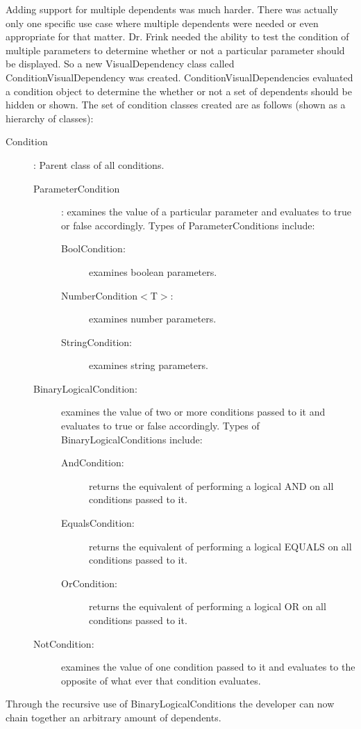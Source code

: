 Adding support for multiple dependents was much harder. There was actually only one specific use case where multiple dependents were needed or even appropriate for that matter. Dr.
Frink needed the ability to test the condition of multiple parameters to determine whether or not a particular parameter should be displayed.
So a new VisualDependency class called ConditionVisualDependency was created. ConditionVisualDependencies evaluated a condition object to
determine the whether or not a set of dependents should be hidden or shown. The set of condition classes created are as follows (shown as a hierarchy of classes):
\begin{description}
	\item[Condition]: Parent class of all conditions.
	\begin{description}
		\item[ParameterCondition]: examines the value of a particular parameter and evaluates to true or false accordingly. Types of ParameterConditions include:
		\begin{description}
			\item[BoolCondition:] examines boolean parameters.
			\item[NumberCondition$<$T$>$:] examines number parameters.
			\item[StringCondition:] examines string parameters.
		\end{description}
		\item[BinaryLogicalCondition:] examines the value of two or more conditions passed to it and evaluates to true or false accordingly. Types of BinaryLogicalConditions include:
		\begin{description}
			\item[AndCondition:] returns the equivalent of performing a logical AND on all conditions passed to it.
			\item[EqualsCondition:] returns the equivalent of performing a logical EQUALS on all conditions passed to it.
			\item[OrCondition:] returns the equivalent of performing a logical OR on all conditions passed to it.
		\end{description}
		\item[NotCondition:] examines the value of one condition passed to it and evaluates to the opposite of what ever that condition evaluates.
	\end{description}
\end{description}
Through the recursive use of BinaryLogicalConditions the developer can now chain together an arbitrary amount of dependents.

